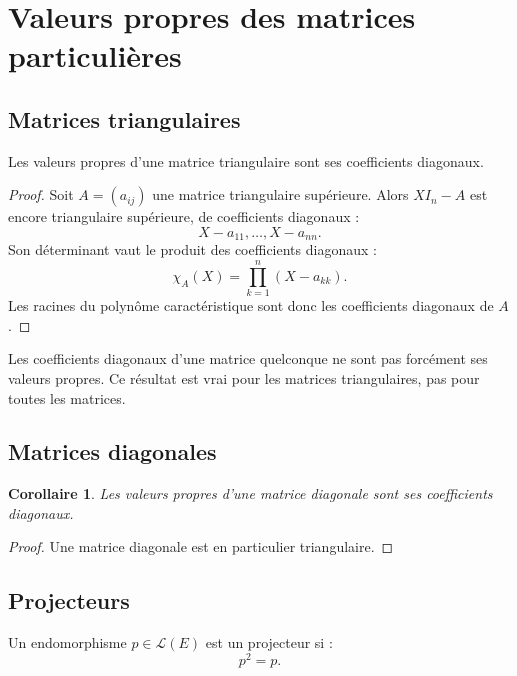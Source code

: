 \documentclass[11pt,a4paper]{article}
\newcommand{\Lcal}{\mathcal L}
\newtheorem{corollaire}[prop]{Corollaire}
\begin{document}
\section{Valeurs propres des matrices particulières}

\subsection{Matrices triangulaires}

\begin{theorembox}
Les valeurs propres d'une matrice triangulaire sont ses coefficients diagonaux.
\end{theorembox}

\begin{proof}
Soit \(A=(a_{ij})\) une matrice triangulaire supérieure.  
Alors \(XI_n-A\) est encore triangulaire supérieure, de coefficients diagonaux :
\[
X-a_{11},\dots,X-a_{nn}.
\]
Son déterminant vaut le produit des coefficients diagonaux :
\[
\chi_A(X)=\prod_{k=1}^n(X-a_{kk}).
\]
Les racines du polynôme caractéristique sont donc les coefficients diagonaux de \(A\).
\end{proof}

\begin{erreurbox}
Les coefficients diagonaux d'une matrice quelconque ne sont pas forcément ses valeurs propres.  
Ce résultat est vrai pour les matrices triangulaires, pas pour toutes les matrices.
\end{erreurbox}

\subsection{Matrices diagonales}

\begin{corollaire}
Les valeurs propres d'une matrice diagonale sont ses coefficients diagonaux.
\end{corollaire}

\begin{proof}
Une matrice diagonale est en particulier triangulaire.
\end{proof}

\subsection{Projecteurs}

\begin{definitionbox}[Projecteur]
Un endomorphisme \(p\in\Lcal(E)\) est un projecteur si :
\[
p^2=p.
\]
\end{definitionbox}
\end{document}
